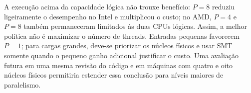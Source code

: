 \documentclass[12pt,a4paper]{article}
\begin{document}
A execução acima da capacidade lógica não trouxe benefício: $P=8$ reduziu
ligeiramente o desempenho no Intel e multiplicou o custo; no AMD, $P=4$ e
$P=8$ também permaneceram limitados às duas CPUs lógicas. Assim, a melhor
política não é maximizar o número de threads. Entradas pequenas favorecem
$P=1$; para cargas grandes, deve-se priorizar os núcleos físicos e usar SMT
somente quando o pequeno ganho adicional justificar o custo. Uma avaliação
futura em uma mesma revisão do código e em máquinas com quatro e oito núcleos
físicos permitiria estender essa conclusão para níveis maiores de paralelismo.

\clearpage
\begingroup
\singlespacing
\small
\printbibliography[heading=bibintoc,title={Referências}]
\endgroup
\end{document}
